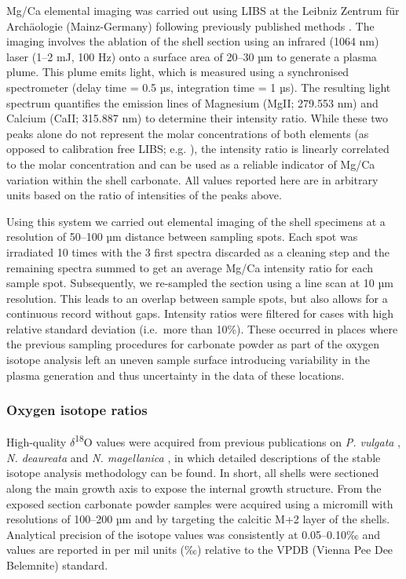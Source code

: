 \documentclass[
  authoryear,
  preprint,
  3p]{elsarticle}
\begin{document}
Mg/Ca elemental imaging was carried out using LIBS at the Leibniz
Zentrum für Archäologie (Mainz-Germany) following previously published
methods \citep{Hausmann2023-ih}. The imaging involves the ablation of
the shell section using an infrared (1064 nm) laser (1--2 mJ, 100 Hz)
onto a surface area of 20--30 µm to generate a plasma plume. This plume
emits light, which is measured using a synchronised spectrometer (delay
time = 0.5 µs, integration time = 1 µs). The resulting light spectrum
quantifies the emission lines of Magnesium (MgII; 279.553 nm) and
Calcium (CaII; 315.887 nm) to determine their intensity ratio. While
these two peaks alone do not represent the molar concentrations of both
elements (as opposed to calibration free LIBS; e.g.
\citep{Martinez-Minchero2022-jz}), the intensity ratio is linearly
correlated to the molar concentration \citep{Hausmann2017-oa} and can be
used as a reliable indicator of Mg/Ca variation within the shell
carbonate. All values reported here are in arbitrary units based on the
ratio of intensities of the peaks above.

Using this system we carried out elemental imaging of the shell
specimens at a resolution of 50--100 µm distance between sampling spots.
Each spot was irradiated 10 times with the 3 first spectra discarded as
a cleaning step and the remaining spectra summed to get an average Mg/Ca
intensity ratio for each sample spot. Subsequently, we re-sampled the
section using a line scan at 10 µm resolution. This leads to an overlap
between sample spots, but also allows for a continuous record without
gaps. Intensity ratios were filtered for cases with high relative
standard deviation (i.e.~more than 10\%). These occurred in places where
the previous sampling procedures for carbonate powder as part of the
oxygen isotope analysis left an uneven sample surface introducing
variability in the plasma generation and thus uncertainty in the data of
these locations.

\subsubsection{Oxygen isotope ratios}\label{oxygen-isotope-ratios}

High-quality \(\delta\)\textsuperscript{18}O values were acquired from
previous publications on \emph{P. vulgata}
\citep{Surge2012-ba, Graniero2017-io}, \emph{N. deaureata} and \emph{N.
magellanica} \citep{Nicastro2020-ih}, in which detailed descriptions of
the stable isotope analysis methodology can be found. In short, all
shells were sectioned along the main growth axis to expose the internal
growth structure. From the exposed section carbonate powder samples were
acquired using a micromill with resolutions of 100--200 µm and by
targeting the calcitic M+2 layer of the shells. Analytical precision of
the isotope values was consistently at 0.05--0.10‰ and values are
reported in per mil units (‰) relative to the VPDB (Vienna Pee Dee
Belemnite) standard.
\end{document}
